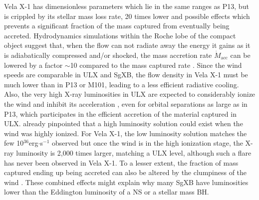 \documentclass[letter]{aa}
\makeatletter
\newcommand{\sgx}{SgXB\xspace}
\newcommand{\ulx}{ULX\xspace}
\newcommand*{\ns}{NS\@\xspace}
\newcommand*{\bh}{BH\@\xspace}
\newcommand{\mystar}{{\fontfamily{lmr}\selectfont$\star$}}
\newcommand*{\mdotstar}{$\dot{M}_{\text{\mystar}}$\@\xspace}
\newcommand*{\mdotacc}{$\dot{M}_{\text{acc}}$\@\xspace}
\makeatother
\begin{document}
Vela X-1 has dimensionless parameters which lie in the same ranges as P13, but is crippled by its stellar mass loss rate, 20 times lower and possible effects which prevents a significant fraction of the mass captured from eventually being accreted. Hydrodynamics simulations within the Roche lobe of the compact object suggest that, when the flow can not radiate away the energy it gains as it is adiabatically compressed and/or shocked, the mass accretion rate \mdotacc can be lowered by a factor $\sim$10 compared to the mass captured rate \citep{ElMellah2018}. Since the wind speeds are comparable in \ulx and \sgx, the flow density in Vela X-1 must be much lower than in P13 or M101, leading to a less efficient radiative cooling. Also, the very high X-ray luminosities in \ulx are expected to considerably ionize the wind and inhibit its acceleration \citep{Blondin1991,Manousakis2015c}, even for orbital separations as large as in P13, which participates in the efficient accretion of the material captured in \ulx. \cite{Ho1987} already pinpointed that a high luminosity solution could exist when the wind was highly ionized. For Vela X-1, the low luminosity solution matches the few 10$^{36}$erg$\cdot$s$^{-1}$ observed but once the wind is in the high ionization stage, the X-ray luminosity is 2,000 times larger, matching a \ulx level, although such a flare has never been observed in Vela X-1. To a lesser extent, the fraction of mass captured ending up being accreted can also be altered by the clumpiness of the wind \citep{Sundqvist2017,ElMellah}. These combined effects might explain why many \sgx have luminosities lower than the Eddington luminosity of a \ns or a stellar mass \bh.

\end{document}
